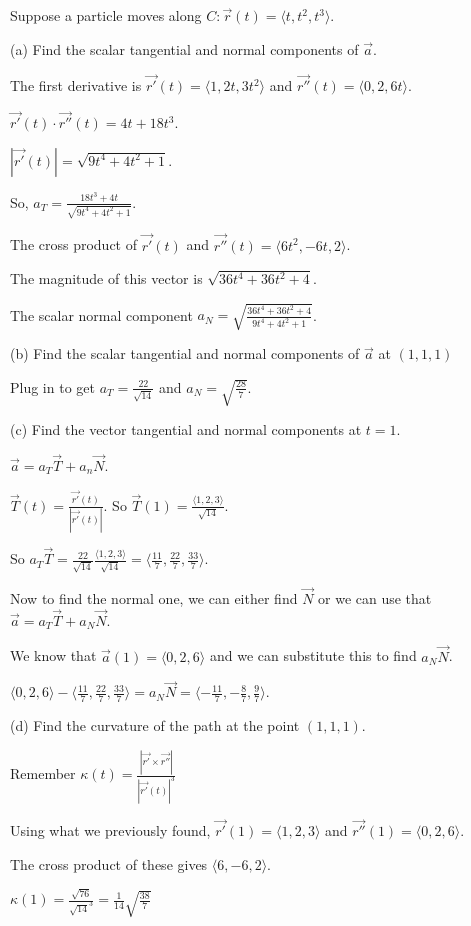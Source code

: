 \documentclass[../calc3.tex]{subfiles}
\begin{document}
\pagebreak
\begin{example}
    Suppose a particle moves along $C: \vec{r}(t)=\langle t,t^2,t^3\rangle$.

    (a) Find the scalar tangential and normal components of $\vec{a}$.

    The first derivative is $\vec{r'}(t)=\langle 1,2t,3t^2\rangle$ and $\vec{r''}(t)=\langle 0,2,6t\rangle$.

    $\vec{r'}(t)\cdot \vec{r''}(t)=4t+18t^3$.

    $|\vec{r'}(t)| = \sqrt{9t^4+4t^2+1}$.

    So, $a_T = \frac{18t^3+4t}{\sqrt{9t^4+4t^2+1}}$.

    The cross product of $\vec{r'}(t)$ and $\vec{r''}(t)= \langle 6t^2,-6t,2\rangle$.

    The magnitude of this vector is $\sqrt{36t^4+36t^2+4}$.

    The scalar normal component $a_N = \sqrt{\frac{36t^4+36t^2+4}{9t^4+4t^2+1}}$.

    (b) Find the scalar tangential and normal components of $\vec{a}$ at $(1,1,1)$

    Plug in to get $a_T = \frac{22}{\sqrt{14}}$ and $a_N = \sqrt{\frac{28}{7}}$.

    (c) Find the vector tangential and normal components at $t=1$.

    $\vec{a}=a_T\vec{T}+a_n\vec{N}$.

    $\vec{T}(t)=\frac{\vec{r'}(t)}{|\vec{r'}(t)|}$. So $\vec{T}(1)=\frac{\langle 1,2,3\rangle}{\sqrt{14}}$.

    So $a_T \vec{T} = \frac{22}{\sqrt{14}}\frac{\langle 1,2,3\rangle}{\sqrt{14}}=\langle \frac{11}{7}, \frac{22}{7}, \frac{33}{7}\rangle$.

    Now to find the normal one, we can either find $\vec{N}$ or we can use that $\vec{a}=a_T\vec{T}+a_N\vec{N}$.

    We know that $\vec{a}(1)=\langle 0,2,6\rangle$ and we can substitute this to find $a_N \vec{N}$.

    $\langle 0,2,6\rangle -\langle \frac{11}{7}, \frac{22}{7},\frac{33}{7}\rangle = a_N\vec{N}=\langle -\frac{11}{7}, -\frac{8}{7}, \frac{9}{7}\rangle$.

    (d) Find the curvature of the path at the point $(1,1,1)$.

    Remember $\kappa(t)=\frac{|\vec{r'}\times \vec{r''}|}{|\vec{r'}(t)|^3}$

    Using what we previously found, $\vec{r'}(1)=\langle 1,2,3\rangle$ and $\vec{r''}(1)=\langle 0,2,6\rangle$.

    The cross product of these gives $\langle 6,-6,2\rangle$.

    $\kappa(1)=\frac{\sqrt{76}}{\sqrt{14}^3}=\frac{1}{14}\sqrt{\frac{38}{7}}$
\end{example}
\end{document}
